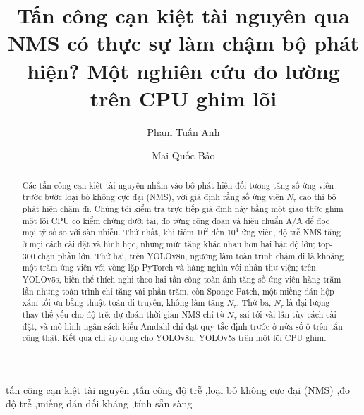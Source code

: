 \documentclass[a4paper,fleqn]{cas-dc}
\newcommand{\Ntau}{N_{\tau}}
\begin{document}
\let\WriteBookmarks\relax
\def\floatpagepagefraction{1}
\def\textpagefraction{.001}
\title[mode=title]{Tấn công cạn kiệt tài nguyên qua NMS có thực sự làm chậm bộ phát hiện? Một nghiên cứu đo lường trên CPU ghim lõi}
\author[1]{Phạm Tuấn Anh}
\author[1]{Mai Quốc Bảo}

\begin{abstract}
Các tấn công cạn kiệt tài nguyên nhắm vào bộ phát hiện đối tượng tăng số ứng viên trước bước loại bỏ không cực đại (NMS), với giả định rằng số ứng viên $\Ntau$ cao thì bộ phát hiện chậm đi. Chúng tôi kiểm tra trực tiếp giả định này bằng một giao thức ghim một lõi CPU có kiểm chứng dưới tải, đo từng công đoạn và hiệu chuẩn A/A để đọc mọi tỷ số so với sàn nhiễu. Thứ nhất, khi tiêm $10^2$ đến $10^4$ ứng viên, độ trễ NMS tăng ở mọi cách cài đặt và hình học, nhưng mức tăng khác nhau hơn hai bậc độ lớn; top-300 chặn phần lớn. Thứ hai, trên YOLOv8n, ngưỡng làm toàn trình chậm đi là khoảng một trăm ứng viên với vòng lặp PyTorch và hàng nghìn với nhân thư viện; trên YOLOv5s, biến thể thích nghi theo hai tấn công toàn ảnh tăng số ứng viên hàng trăm lần nhưng toàn trình chỉ tăng vài phần trăm, còn Sponge Patch, một miếng dán hộp xám tối ưu bằng thuật toán di truyền, không làm tăng $\Ntau$. Thứ ba, $\Ntau$ là đại lượng thay thế yếu cho độ trễ: dự đoán thời gian NMS chỉ từ $\Ntau$ sai tới vài lần tùy cách cài đặt, và mô hình ngân sách kiểu Amdahl chỉ đạt quy tắc định trước ở nửa số ô trên tấn công thật. Kết quả chỉ áp dụng cho YOLOv8n, YOLOv5s trên một lõi CPU ghim.
\end{abstract}

\begin{keywords}[Từ khóa]
tấn công cạn kiệt tài nguyên \sep tấn công độ trễ \sep loại bỏ không cực đại (NMS) \sep đo độ trễ \sep miếng dán đối kháng \sep tính sẵn sàng
\end{keywords}
\maketitle
\end{document}
